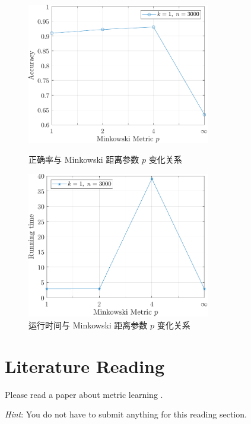 \documentclass{article}
\begin{document}
\begin{figure}[htbp]
  \centering
  \begin{minipage}[t]{0.48\textwidth}
    \centering
    \includegraphics[width=8cm]{pAccuracy.pdf}
    \caption{正确率与 Minkowski 距离参数 $p$ 变化关系}
    \label{fig:pAccuracy}
  \end{minipage}
  \begin{minipage}[t]{0.48\textwidth}
    \centering
    \includegraphics[width=8cm]{pTime.pdf}
    \caption{运行时间与 Minkowski 距离参数 $p$ 变化关系}
    \label{fig:pTime}
  \end{minipage}
\end{figure}

\section*{Literature Reading}
Please read a paper about metric learning \cite{metric_learning}.

\emph{Hint}: You do not have to submit anything for this reading section.
\end{document}
